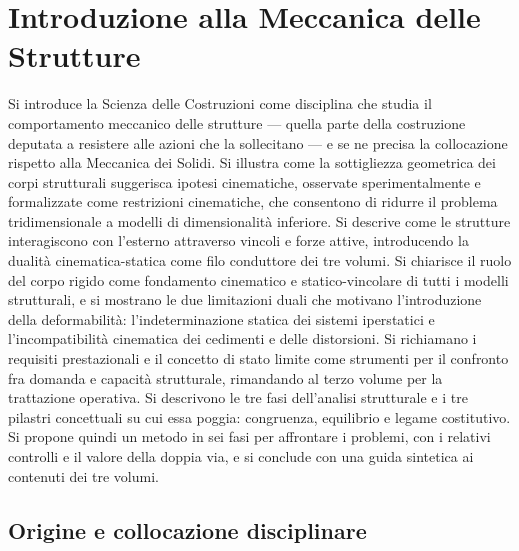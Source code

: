 \graphicspath{{Parti/P00-Introduzione/C00-Introduzione/Figure/}}
\chapter{Introduzione alla Meccanica delle Strutture}\label{cap:introduzione}

\begin{sommario}
Si introduce la Scienza delle Costruzioni come disciplina che studia il comportamento meccanico delle strutture --- quella parte della costruzione deputata a resistere alle azioni che la sollecitano --- e se ne precisa la collocazione rispetto alla Meccanica dei Solidi. Si illustra come la sottigliezza geometrica dei corpi strutturali suggerisca ipotesi cinematiche, osservate sperimentalmente e formalizzate come restrizioni cinematiche, che consentono di ridurre il problema tridimensionale a modelli di dimensionalità inferiore. Si descrive come le strutture interagiscono con l'esterno attraverso vincoli e forze attive, introducendo la dualità cinematica-statica come filo conduttore dei tre volumi. Si chiarisce il ruolo del corpo rigido come fondamento cinematico e statico-vincolare di tutti i modelli strutturali, e si mostrano le due limitazioni duali che motivano l'introduzione della deformabilità: l'indeterminazione statica dei sistemi iperstatici e l'incompatibilità cinematica dei cedimenti e delle distorsioni. Si richiamano i requisiti prestazionali e il concetto di stato limite come strumenti per il confronto fra domanda e capacità strutturale, rimandando al terzo volume per la trattazione operativa. Si descrivono le tre fasi dell'analisi strutturale e i tre pilastri concettuali su cui essa poggia: congruenza, equilibrio e legame costitutivo. Si propone quindi un metodo in sei fasi per affrontare i problemi, con i relativi controlli e il valore della doppia via, e si conclude con una guida sintetica ai contenuti dei tre volumi.
\end{sommario}

\section{Origine e collocazione disciplinare}

